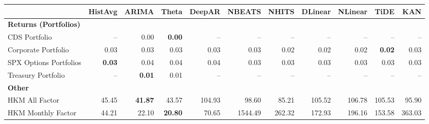 \scriptsize
\setlength{\tabcolsep}{1.5pt}
\renewcommand{\arraystretch}{0.9}
\begin{tabular}{@{}lrrrrrrrrrr@{}}
\toprule
 & HistAvg & ARIMA & Theta & DeepAR & NBEATS & NHITS & DLinear & NLinear & TiDE & KAN \\
\midrule
\multicolumn{11}{l}{\textbf{Returns (Portfolios)}} \\
CDS Portfolio & -- & 0.00 & \textbf{0.00} & -- & -- & -- & -- & -- & -- & -- \\
Corporate Portfolio & 0.03 & 0.03 & 0.03 & 0.03 & 0.03 & 0.02 & 0.02 & 0.02 & \textbf{0.02} & 0.03 \\
SPX Options Portfolios & \textbf{0.03} & 0.04 & 0.04 & 0.04 & 0.03 & 0.03 & 0.03 & 0.03 & 0.03 & 0.03 \\
Treasury Portfolio & -- & \textbf{0.01} & 0.01 & -- & -- & -- & -- & -- & -- & -- \\
\midrule
\multicolumn{11}{l}{\textbf{Other}} \\
HKM All Factor & 45.45 & \textbf{41.87} & 43.57 & 104.93 & 98.60 & 85.21 & 105.52 & 106.78 & 105.53 & 95.90 \\
HKM Monthly Factor & 44.21 & 22.10 & \textbf{20.80} & 70.65 & 1544.49 & 262.32 & 172.93 & 196.16 & 153.58 & 363.03 \\
\bottomrule
\end{tabular}